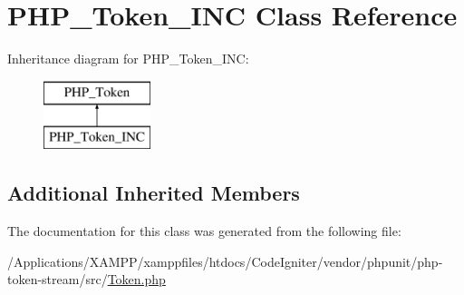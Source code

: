 \hypertarget{class_p_h_p___token___i_n_c}{}\section{P\+H\+P\+\_\+\+Token\+\_\+\+I\+NC Class Reference}
\label{class_p_h_p___token___i_n_c}
Inheritance diagram for P\+H\+P\+\_\+\+Token\+\_\+\+I\+NC\+:\begin{figure}[H]
\begin{center}
\leavevmode
\includegraphics[height=2.000000cm]{class_p_h_p___token___i_n_c}
\end{center}
\end{figure}
\subsection*{Additional Inherited Members}


The documentation for this class was generated from the following file\+:\begin{DoxyCompactItemize}
\item 
/\+Applications/\+X\+A\+M\+P\+P/xamppfiles/htdocs/\+Code\+Igniter/vendor/phpunit/php-\/token-\/stream/src/\mbox{\hyperlink{_token_8php}{Token.\+php}}\end{DoxyCompactItemize}
